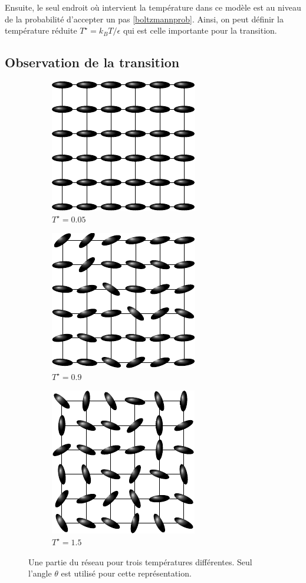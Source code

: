 \documentclass[11pt]{article}
\numberwithin{equation}{section}
\begin{document}
Ensuite, le seul endroit où intervient la température dans ce modèle est au niveau de la probabilité d'accepter un pas \ref{boltzmannprob}. Ainsi, on peut définir la température réduite $T^\star = k_B T /\epsilon$ qui est celle importante pour la transition.

\subsection{Observation de la transition}
\begin{figure}[h!]
\center
    \begin{subfigure}[b]{0.30\textwidth}
    	\center
    	\includegraphics[scale=1]{figures/00.pdf}
    	\caption{$T^\star =0.05$}
    	\label{fonda}
    \end{subfigure}	
	\begin{subfigure}[b]{0.30\textwidth}
    	\center
    	\includegraphics[scale=1]{figures/09.pdf}
    	\caption{$T^\star =0.9$}
    	\label{09}
    \end{subfigure}
    \begin{subfigure}[b]{0.30\textwidth}
    	\center
    	\includegraphics[scale=1]{figures/15.pdf}
    	\caption{$T^\star =1.5$}
    	\label{15}
    \end{subfigure}	
    \caption{Une partie du réseau pour trois températures différentes. Seul l'angle $\theta$ est utilisé pour cette représentation. }
    \label{lattice}
\end{figure}
\end{document}
